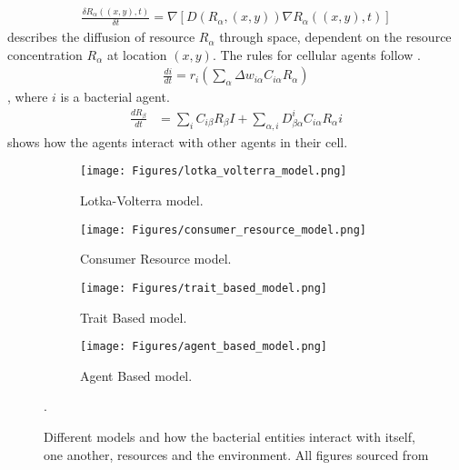 \begin{align} 
    \label{eq:resource_diffusion}
    \frac{\delta R_\alpha(\left(x, y\right), t)}{\delta t} = \nabla \left[D \left( R_\alpha, \left(x, y\right) \right) \nabla R_\alpha \left(\left(x, y\right), t \right) \right]
\end{align}
 describes the diffusion of resource $R_\alpha$ through space, dependent on the resource concentration $R_\alpha$ at location $(x, y)$. 
The rules for cellular agents follow . 
\begin{align} 
    \label{eq:agent_rules}
    \frac{di}{dt} = r_i \left( \sum_\alpha \Delta w_{i\alpha}C_{i\alpha}R_\alpha\right)
\end{align}, 
where $i$ is a bacterial agent. 
\begin{align} 
    \label{eq:agent_consumption_and_conversion}
    \frac{dR_\beta}{dt} &= \sum_i C_{i\beta}R_\beta I + \sum_{\alpha, i}D_{\beta \alpha}^{i} C_{i \alpha} R_\alpha i
\end{align}
 shows how the agents interact with other agents in their cell. 

\begin{figure}[h!]
    \centering
    \begin{subfigure}{0.49\linewidth}
        \centering
        \captionsetup{width=1\linewidth}
        \texttt{[image: Figures/lotka\_volterra\_model.png]}
        \caption{
            Lotka-Volterra model.
        }
        \label{fig:lotka_volterra_model}
    \end{subfigure}
    \hfill
    \begin{subfigure}{0.49\linewidth}
        \centering
        \captionsetup{width=1\linewidth}
        \texttt{[image: Figures/consumer\_resource\_model.png]}
        \caption{
            Consumer Resource model.
        }
        \label{fig:consumer_resource_model}
    \end{subfigure}
    \hfill
    \begin{subfigure}{0.49\linewidth}
        \centering
        \captionsetup{width=1\linewidth}
        \texttt{[image: Figures/trait\_based\_model.png]}
        \caption{
            Trait Based model. 
        }
        \label{fig:trait_based_model}
    \end{subfigure}
    \hfill
    \begin{subfigure}{0.49\linewidth}
        \centering
        \captionsetup{width=1\linewidth}
        \texttt{[image: Figures/agent\_based\_model.png]}
        \caption{
            Agent Based model. 
        }
        \label{fig:agent_based_model}
    \end{subfigure}
    \caption{Different models and how the bacterial entities interact with itself, one another, resources and the environment. All figures sourced from \citet{vandenbergEcologicalModellingApproaches2022}}. 
\end{figure}


